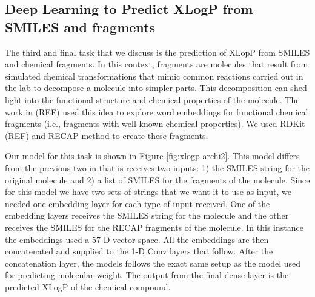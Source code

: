     \subsection{Deep Learning to Predict XLogP from SMILES and fragments}
    The third and final task that we discuss is the prediction of XLopP from SMILES and chemical fragments. In this context, 
    fragments are molecules that result from simulated chemical transformations  that mimic  common reactions carried out in the lab to decompose a molecule into simpler parts. This decomposition can shed light into the functional structure and chemical properties of the molecule. The work in (REF) used this idea to explore word embeddings for functional chemical fragments 
    (i.e., fragments with well-known chemical properties). We used RDKit (REF) and RECAP method to create these fragments.
    
    Our model for this task is shown in Figure \ref{fig:xlogp-archi2}. This model differs from the previous two in that is receives two inputs: 1) the SMILES string for the original molecule and 2) a list of SMILES for the fragments of the molecule. Since for this model we have two sets of strings that we want it to use as input, we needed one embedding layer for each type of input received. One of the embedding layers receives the SMILES string for the molecule and the other receives the SMILES for the RECAP fragments of the molecule. In this instance
    the embeddings used a 57-D vector space. All the embeddings are then concatenated and supplied to the 1-D Conv layers that follow. 
    After the concatenation layer, the models follows the exact same setup as the model used for predicting molecular weight. The output from the final dense layer is the predicted XLogP of the chemical compound.
    
    
